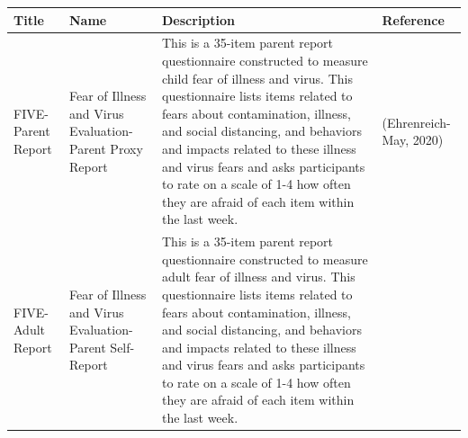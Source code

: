 \documentclass[]{book}
\begin{document}
\begin{longtable}[]{@{}llll@{}}
\toprule
\begin{minipage}[b]{0.13\columnwidth}\raggedright
Title\strut
\end{minipage} & \begin{minipage}[b]{0.21\columnwidth}\raggedright
Name\strut
\end{minipage} & \begin{minipage}[b]{0.38\columnwidth}\raggedright
Description\strut
\end{minipage} & \begin{minipage}[b]{0.15\columnwidth}\raggedright
Reference\strut
\end{minipage}\tabularnewline
\midrule
\endhead
\begin{minipage}[t]{0.13\columnwidth}\raggedright
FIVE-Parent Report\strut
\end{minipage} & \begin{minipage}[t]{0.21\columnwidth}\raggedright
Fear of Illness and Virus Evaluation- Parent Proxy Report\strut
\end{minipage} & \begin{minipage}[t]{0.38\columnwidth}\raggedright
This is a 35-item parent report questionnaire constructed to measure child fear of illness and virus. This questionnaire lists items related to fears about contamination, illness, and social distancing, and behaviors and impacts related to these illness and virus fears and asks participants to rate on a scale of 1-4 how often they are afraid of each item within the last week.\strut
\end{minipage} & \begin{minipage}[t]{0.15\columnwidth}\raggedright
(Ehrenreich-May, 2020)\strut
\end{minipage}\tabularnewline
\begin{minipage}[t]{0.13\columnwidth}\raggedright
FIVE- Adult Report\strut
\end{minipage} & \begin{minipage}[t]{0.21\columnwidth}\raggedright
Fear of Illness and Virus Evaluation- Parent Self-Report\strut
\end{minipage} & \begin{minipage}[t]{0.38\columnwidth}\raggedright
This is a 35-item parent report questionnaire constructed to measure adult fear of illness and virus. This questionnaire lists items related to fears about contamination, illness, and social distancing, and behaviors and impacts related to these illness and virus fears and asks participants to rate on a scale of 1-4 how often they are afraid of each item within the last week.\strut

\end{minipage}
\end{longtable}
\end{document}
